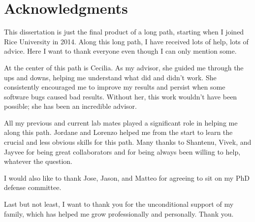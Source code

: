\chapter*{Acknowledgments}


This dissertation is just the final product of a long path, starting when I joined Rice University in 2014.
Along this long path, I have received lots of help, lots of advice. Here I want to thank everyone even though 
I can only mention some.

At the center of this path is Cecilia. As my advisor, she guided me through the ups and downs, helping me understand what did and didn't work. 
She consistently encouraged me to improve my results and persist when some software bugs caused bad results. Without her, this work wouldn't have been possible; she has been an incredible advisor. 

All my previous and current lab mates played a significant role in helping me along this path. Jordane and Lorenzo helped me from the start to learn the crucial and less obvious skills for this path. Many thanks to Shantenu, Vivek, and Jayvee for being great collaborators and for being always been willing to help, whatever the question.


I would also like to thank Jose, Jason, and Matteo for agreeing to sit on my PhD defense
committee.

Last but not least, I want to thank you for the unconditional support of my family, which has helped me grow professionally
and personally. Thank you.
